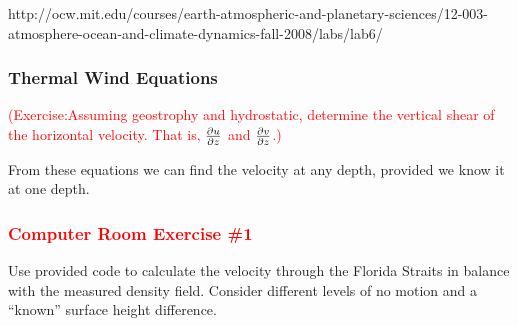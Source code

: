 \documentclass[xcolor=dvipsnames]{beamer}
\begin{document}
\begin{frame}
http://ocw.mit.edu/courses/earth-atmospheric-and-planetary-sciences/12-003-atmosphere-ocean-and-climate-dynamics-fall-2008/labs/lab6/
\end{frame}

\begin{frame}
\frametitle{Thermal Wind Equations}
\textcolor{red}{(Exercise:Assuming geostrophy and hydrostatic, determine the vertical shear of the horizontal velocity.  That is, $\frac {\partial u}{\partial z}$ and $\frac {\partial v}{\partial z}$.)}

From these equations we can find the velocity at any depth, provided we know it at one depth.
\end{frame}

\begin{frame}
\frametitle{\textcolor{red}{Computer Room Exercise \#1}}

 Use provided code to calculate the velocity through the Florida Straits in balance with the measured density field. Consider different levels of no motion and a ``known'' surface height difference.


\end{frame}
\end{document}
